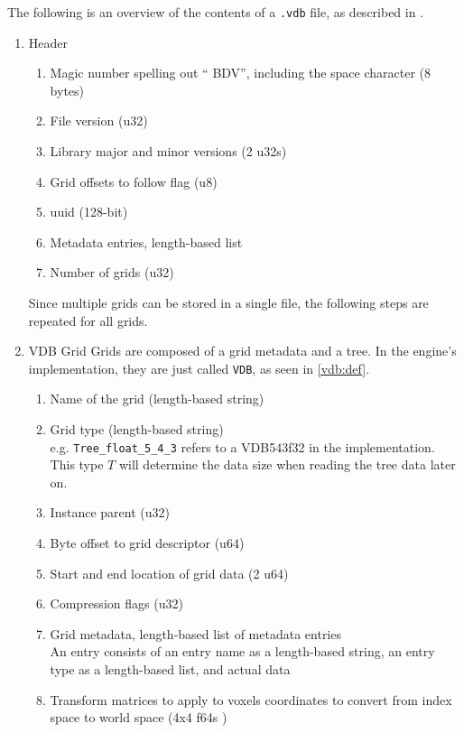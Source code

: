The following is an overview of the contents of a \verb|.vdb| file, as described in \cite{vdbfile}.


\begin{enumerate}
  \item Header
        \begin{enumerate}
          \item Magic number spelling out `` BDV'', including the space character (8 bytes)
          \item File version (u32)
          \item Library major and minor versions (2 u32s)
          \item Grid offsets to follow flag (u8)
          \item \acrshort{uuid} (128-bit)
          \item Metadata entries, length-based list
          \item Number of grids (u32)
        \end{enumerate}
        Since multiple grids can be stored in a single file, the following steps are repeated for all grids.
  \item VDB Grid
        Grids are composed of a grid metadata and a tree. In the engine's implementation, they are just called \verb|VDB|, as seen in \cref{vdb:def}.
        \begin{enumerate}
          \item Name of the grid (length-based string)
          \item Grid type (length-based string) \\
                e.g. \verb|Tree_float_5_4_3| refers to a VDB543\<f32\> in the implementation.
                This type $T$ will determine the data size when reading the tree data later on.
          \item Instance parent (u32)
          \item Byte offset to grid descriptor (u64)
          \item Start and end location of grid data (2 u64)
          \item Compression flags (u32)
          \item\label{file:meta} Grid metadata, length-based list of metadata entries \\
                An entry consists of an entry name as a length-based string, an entry type as a length-based list, and actual data
          \item Transform matrices to apply to voxels coordinates to convert from index space to world space (4x4 f64s )

\end{enumerate}
\end{enumerate}
